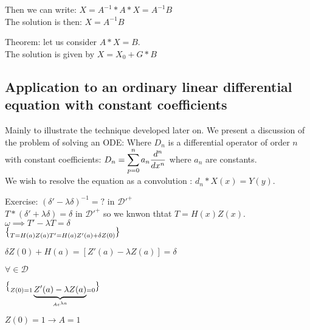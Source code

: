 \documentclass[11pt, openright]{book}
\begin{document}
Then we can write: $X=A^{-1}*A*X=A^{-1}B$\\
The solution is then: $X=A^{-1}B$\\

\begin{dent}{Theorem:} let us consider $A*X=B$.\\
    The solution is given by $X=X_0+G*B$
\end{dent}

\subsection{Application to an ordinary linear differential equation with constant coefficients}

Mainly to illustrate the technique developed later on. We present a discussion of the problem of solving an ODE:
Where $D_n$ is a differential operator of order $n$ with constant coefficients: $\displaystyle{D_n=\sum_{p=0}^{n} a_n \frac{d^n}{dx^n}}$ where $a_n$ are constants.\\

We wish to resolve the equation as a convolution : $d_n*X(x)=Y(y)$.\\

\begin{dent}{Exercise:} $(\delta'-\lambda\delta)^{-1}= ?$ in $\mathcal{D'}^{+}$\\

    $T*(\delta'+\lambda\delta)=\delta$ in $\mathcal{D'}^{+}$ so we knwon thtat $T=H(x)Z(x)$.\\
    $\omega \implies T'-\lambda T=\delta$\\
    $\begin{brace}
            T=H(a)Z(a)\\
            T'=H(a)Z'(a)+\delta Z(0)\\
        \end{brace}$

    $\delta Z(0)+H(a) = \left[ Z'(a)-\lambda Z(a) \right] = \delta $

    $\forall \in \mathcal{D}$

    $\begin{brace}
            Z(0)=1\\
            \underbrace{Z'(a)-\lambda Z(a)}_{Ae^{\lambda a}}=0\\
        \end{brace}$

    $Z(0)=1 \to A=1$

\end{dent}
\end{document}
